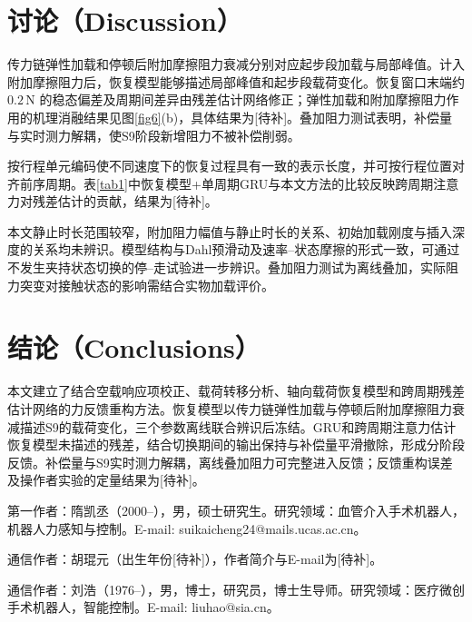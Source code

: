 \documentclass{JQR_LaTeX_Template-0507/JQRnew}
\providecommand{\RevisionColor}{\color{black}}
\newcommand{\revbegin}{\begingroup\RevisionColor}
\newcommand{\revend}{\par\endgroup}
\begin{document}
\section{讨论（Discussion）}

\revbegin
传力链弹性加载和停顿后附加摩擦阻力衰减分别对应起步段加载与局部峰值。计入附加摩擦阻力后，恢复模型能够描述局部峰值和起步段载荷变化。恢复窗口末端约 $0.2\,\mathrm{N}$ 的稳态偏差及周期间差异由残差估计网络修正；弹性加载和附加摩擦阻力作用的机理消融结果见图\ref{fig6}(b)，具体结果为[待补]。叠加阻力测试表明，补偿量与实时测力解耦，使S9阶段新增阻力不被补偿削弱。
\revend

\revbegin
按行程单元编码使不同速度下的恢复过程具有一致的表示长度，并可按行程位置对齐前序周期。表\ref{tab1}中恢复模型+单周期GRU与本文方法的比较反映跨周期注意力对残差估计的贡献，结果为[待补]。
\revend

\revbegin
本文静止时长范围较窄，附加阻力幅值与静止时长的关系、初始加载刚度与插入深度的关系均未辨识。模型结构与Dahl预滑动及速率--状态摩擦的形式一致\cite{dahl1968,ruina1983}，可通过不发生夹持状态切换的停--走试验进一步辨识。叠加阻力测试为离线叠加，实际阻力突变对接触状态的影响需结合实物加载评价。
\revend

\section{结论（Conclusions）}

\revbegin
本文建立了结合空载响应项校正、载荷转移分析、轴向载荷恢复模型和跨周期残差估计网络的力反馈重构方法。恢复模型以传力链弹性加载与停顿后附加摩擦阻力衰减描述S9的载荷变化，三个参数离线联合辨识后冻结。GRU和跨周期注意力估计恢复模型未描述的残差，结合切换期间的输出保持与补偿量平滑撤除，形成分阶段反馈。补偿量与S9实时测力解耦，离线叠加阻力可完整进入反馈；反馈重构误差及操作者实验的定量结果为[待补]。
\revend

\noindent




\begin{AuthorIntroduction}
\Intro 第一作者：隋凯丞（2000--），男，硕士研究生。研究领域：血管介入手术机器人，机器人力感知与控制。E-mail: suikaicheng24@mails.ucas.ac.cn。
\revbegin

\Intro
通信作者：胡琨元（出生年份[待补]），作者简介与E-mail为[待补]。
\revend

\Intro 通信作者：刘浩（1976--），男，博士，研究员，博士生导师。研究领域：医疗微创手术机器人，智能控制。E-mail: liuhao@sia.cn。

\end{AuthorIntroduction}

\balance
\end{document}
